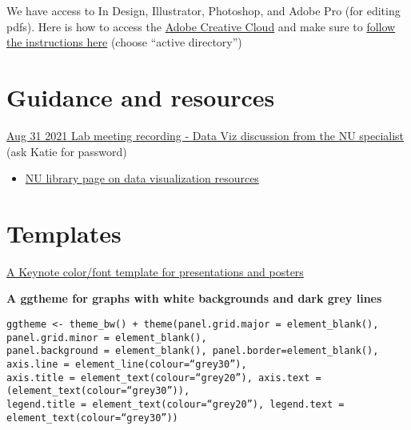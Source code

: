 \documentclass[
  letterpaper,
  DIV=11,
  numbers=noendperiod]{scrreprt}
\providecommand{\tightlist}{%
  \setlength{\itemsep}{0pt}\setlength{\parskip}{0pt}}\usepackage{longtable,booktabs,array}
\begin{document}

We have access to In Design, Illustrator, Photoshop, and Adobe Pro (for
editing pdfs). Here is how to access the
\href{https://adobe.northeastern.edu/}{Adobe Creative Cloud} and make
sure to
\href{https://service.northeastern.edu/ogs?id=kb_article\&sys_id=4128ecdb1b42745069590dc1604bcbb2}{follow
the instructions here} (choose ``active directory'')

\hypertarget{guidance-and-resources}{%
\section*{\texorpdfstring{\textbf{Guidance and
resources}}{Guidance and resources}}\label{guidance-and-resources}}


\href{https://northeastern.zoom.us/rec/share/L4GY5DKi6XCi1nf8_RxkzyGyu6NAojZd4nsNsL1WpxiEfNp5qe_PHd5An9ngPANS.49r97rNHCjo5PNSH}{Aug
31 2021 Lab meeting recording - Data Viz discussion from the NU
specialist} (ask Katie for password)

\begin{itemize}
\tightlist
\item
  \href{https://subjectguides.lib.neu.edu/dataviz/tutorials}{NU library
  page on data visualization resources}
\end{itemize}

\hypertarget{templates}{%
\section*{\texorpdfstring{\textbf{Templates}}{Templates}}\label{templates}}


\href{https://github.com/DrK-Lo/lotterhoslabprotocols/raw/gh-pages/ClassicPresentationTheme.key}{A
Keynote color/font template for presentations and posters}

\textbf{A ggtheme for graphs with white backgrounds and dark grey lines}

\begin{verbatim}
ggtheme <- theme_bw() + theme(panel.grid.major = element_blank(), panel.grid.minor = element_blank(), 
panel.background = element_blank(), panel.border=element_blank(), axis.line = element_line(colour=“grey30”), 
axis.title = element_text(colour=“grey20”), axis.text = (element_text(colour=“grey30”)), 
legend.title = element_text(colour=“grey20”), legend.text = element_text(colour=“grey30”))
\end{verbatim}
\end{document}
